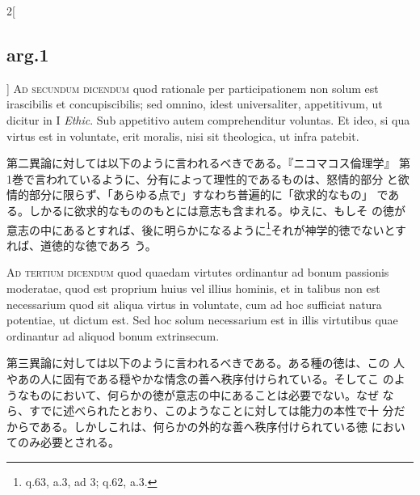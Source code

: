 \documentclass[paper=a4paper,fontsize=10pt,jafontsize=9pt,titlepage]{jlreq}
\begin{document}
\begin{paracol}{2}[\subsection{arg.1}]
{\scshape Ad secundum dicendum} quod rationale per participationem non
solum est irascibilis et concupiscibilis; sed omnino, idest
universaliter, appetitivum, ut dicitur in I {\itshape Ethic}. Sub
appetitivo autem comprehenditur voluntas. Et ideo, si qua virtus est
in voluntate, erit moralis, nisi sit theologica, ut infra patebit.

\switchcolumn

第二異論に対しては以下のように言われるべきである。『ニコマコス倫理学』
 第1巻で言われているように、分有によって理性的であるものは、怒情的部分
 と欲情的部分に限らず、「あらゆる点で」すなわち普遍的に「欲求的なもの」
 である。しかるに欲求的なもののもとには意志も含まれる。ゆえに、もしそ
 の徳が意志の中にあるとすれば、後に明らかになるように\footnote{q.63,
 a.3, ad 3; q.62, a.3.}それが神学的徳でないとすれば、道徳的な徳であろ
 う。

\switchcolumn*[\subsection{ad.3}]

{\scshape Ad tertium dicendum} quod quaedam virtutes ordinantur ad
bonum passionis moderatae, quod est proprium huius vel illius hominis,
et in talibus non est necessarium quod sit aliqua virtus in voluntate,
cum ad hoc sufficiat natura potentiae, ut dictum est. Sed hoc solum
necessarium est in illis virtutibus quae ordinantur ad aliquod bonum
extrinsecum.

\switchcolumn

第三異論に対しては以下のように言われるべきである。ある種の徳は、この
 人やあの人に固有である穏やかな情念の善へ秩序付けられている。そしてこ
 のようなものにおいて、何らかの徳が意志の中にあることは必要でない。なぜ
 なら、すでに述べられたとおり、このようなことに対しては能力の本性で十
 分だからである。しかしこれは、何らかの外的な善へ秩序付けられている徳
 においてのみ必要とされる。

\end{paracol}
\end{document}
